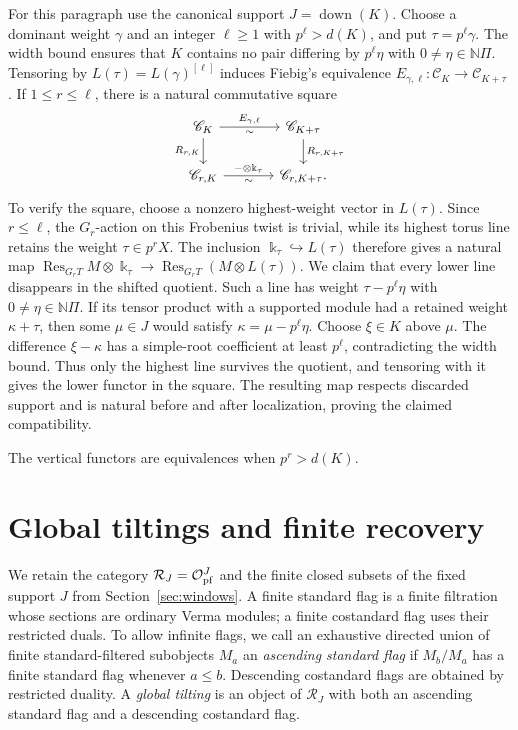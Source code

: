 \documentclass[11pt,reqno]{amsart}
\newcommand{\kk}{\Bbbk}\newcommand{\ZZ}{\mathbb Z}\newcommand{\NN}{\mathbb N}
\newcommand{\OO}{\mathcal O}\newcommand{\CC}{\mathscr C}\newcommand{\RR}{\mathcal R}\newcommand{\DD}{\mathcal D}
\theoremstyle{definition}
\theoremstyle{remark}
\numberwithin{equation}{section}
\begin{document}
For this paragraph use the canonical support
$J=\operatorname{down}(K)$. Choose a dominant weight $\gamma$
and an integer $\ell\geq1$ with $p^\ell>d(K)$, and put
$\tau=p^\ell\gamma$. The width bound ensures that $K$ contains
no pair differing by $p^\ell\eta$ with $0\ne\eta\in\NN\Pi$.
Tensoring by
$L(\tau)=L(\gamma)^{[\ell]}$ induces Fiebig's equivalence
$E_{\gamma,\ell}:\CC_K\to\CC_{K+\tau}$
\cite[Theorem~25]{Fiebig}. If $1\leq r\leq\ell$, there is a
natural commutative square
\begin{equation}\label{eq:periodic-square}
 \begin{tikzcd}[column sep=large]
 \CC_K \arrow[r,"E_{\gamma,\ell}","\sim"']
       \arrow[d,"R_{r,K}"'] &
 \CC_{K+\tau} \arrow[d,"R_{r,K+\tau}"]\\
 \CC_{r,K} \arrow[r,"-\otimes\kk_\tau","\sim"'] &
 \CC_{r,K+\tau}.
 \end{tikzcd}
\end{equation}
To verify the square, choose a nonzero highest-weight vector in
$L(\tau)$. Since $r\leq\ell$, the $G_r$-action on this Frobenius
twist is trivial, while its highest torus line retains the weight
$\tau\in p^rX$. The inclusion $\kk_\tau\hookrightarrow L(\tau)$
therefore gives a natural map
$\operatorname{Res}_{G_rT}M\otimes\kk_\tau
\to\operatorname{Res}_{G_rT}(M\otimes L(\tau))$.
We claim that every lower line disappears in
the shifted quotient. Such a line has weight
$\tau-p^\ell\eta$ with
$0\ne\eta\in\NN\Pi$. If its tensor product with a supported
module had a retained weight $\kappa+\tau$, then some
$\mu\in J$ would satisfy $\kappa=\mu-p^\ell\eta$. Choose
$\xi\in K$ above $\mu$. The difference $\xi-\kappa$ has a
simple-root coefficient at least $p^\ell$, contradicting the
width bound. Thus only the highest line survives the quotient,
and tensoring with it gives the lower functor in the square.
The resulting map respects discarded support and is natural
before and after localization, proving the claimed compatibility.

The vertical functors are equivalences when $p^r>d(K)$.

\section{Global tiltings and finite recovery}\label{sec:tiltings}

We retain the category $\RR_J=\OO^J_{\pf}$ and the finite closed subsets of
the fixed support $J$ from Section~\ref{sec:windows}. A finite standard
flag is a finite filtration whose sections are ordinary Verma modules;
a finite costandard flag uses their restricted duals. To allow infinite
flags, we call an exhaustive directed union of finite standard-filtered
subobjects $M_a$ an \emph{ascending standard flag} if $M_b/M_a$ has a
finite standard flag whenever $a\leq b$. Descending costandard flags
are obtained by restricted duality. A \emph{global tilting} is an object
of $\RR_J$ with both an ascending standard flag and a descending
costandard flag.
\end{document}
